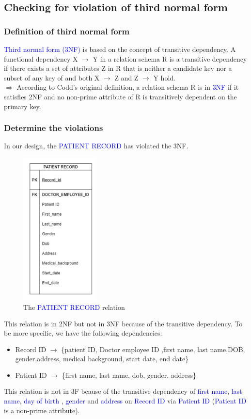 \documentclass[a4paper]{article}
\numberwithin{equation}{section}
\begin{document}
\subsection{Checking for violation of third normal form}
\subsubsection{Definition of third normal form}
\textcolor{blue}{Third normal form (3NF)} is based on the concept of transitive dependency. A functional dependency X \(\rightarrow \) Y in a relation schema R is a transitive dependency if there exists a set of attributes Z in R that is neither a candidate key nor a subset of any key of  and both X \(\rightarrow \) Z and Z \(\rightarrow \) Y hold. \\
\(\Rightarrow \) According to Codd’s original definition, a relation schema R is in
\textcolor{blue}{3NF} if it satisfies 2NF and no non-prime attribute of R is transitively dependent on the primary key.

\subsubsection{Determine the violations}
In our design, the \textcolor{blue}{PATIENT RECORD} has violated the 3NF\@.
\begin{figure}[H]
  \centering
  \includegraphics[width = 4cm ]{assets/3NFviolation.PNG}
  \caption{The \textcolor{blue}{PATIENT RECORD} relation}
\end{figure}

This relation is in 2NF but not in 3NF because of the transitive
dependency. To be more specific, we have the following dependencies:  \begin{itemize}
  \item Record ID \(\rightarrow \) \{patient ID, Doctor employee ID ,first name, last name,DOB, gender,address, medical background, start date, end date\}
  \item Patient ID \(\rightarrow \) \{first name, last name, dob, gender, address\}
\end{itemize}
This relation is not in 3F bcause of the transitive dependency of \textcolor{blue}{first name}, \textcolor{blue}{last name}, \textcolor{blue}{day of birth }, \textcolor{blue}{gender} and \textcolor{blue}{address} on \textcolor{blue}{Record ID} via \textcolor{blue}{Patient ID} (\textcolor{blue}{Patient ID} is a non-prime attribute).
\end{document}

